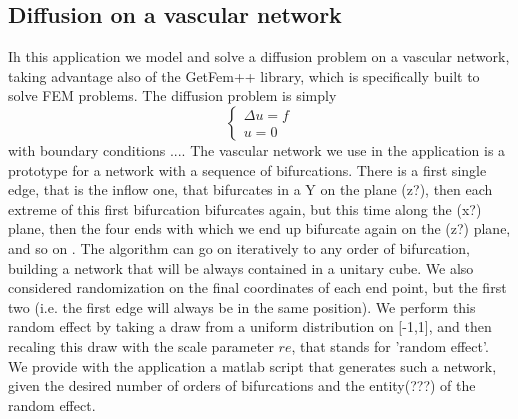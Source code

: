 \documentclass[11pt]{article} %
\begin{document}
	\subsection{Diffusion on a vascular network}
	Ih this application we model and solve a diffusion problem on a vascular network, taking advantage also of the GetFem++ library, which is specifically built to solve FEM problems. \newline
	The diffusion problem is simply
	\begin{equation*}
		\left\{
		\begin{aligned}
		\Delta u = f \\
		u = 0 
		\end{aligned}
		\right.
	\end{equation*}
	with boundary conditions .... 	\newline
	The vascular network we use in the application is a prototype for a network with a sequence of bifurcations. There is a first single edge, that is the inflow one, that bifurcates in a Y on the plane (z?), then each extreme of this first bifurcation bifurcates again, but this time along the (x?) plane, then the four ends with which we end up bifurcate again on the (z?) plane, and so on . The algorithm can go on iteratively to any order of bifurcation, building a network that will be always contained in a unitary cube. We also considered randomization on the final coordinates of each end point, but the first two (i.e. the first edge will always be in the same position). We perform this random effect by taking a draw from a uniform distribution on [-1,1], and then recaling this draw with the scale parameter $re$, that stands for 'random effect'. We provide with the application a matlab script that generates such a network, given the desired number of orders of bifurcations and the entity(???) of the random effect.
		
\end{document}
